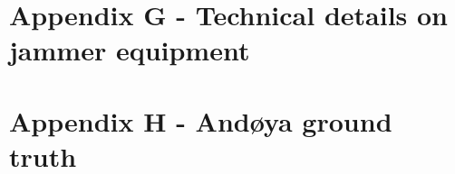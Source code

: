 \documentclass[a4paper]{book}
\begin{document}
\section{Appendix G - Technical details on jammer equipment}

% 

\section{Appendix H - Andøya ground truth}

\end{document}
